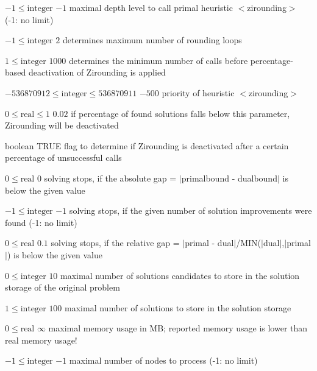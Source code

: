 %
{$-1\leq\textrm{integer}$}%
{$-1$}%
{maximal depth level to call primal heuristic $<$zirounding$>$ (-1: no limit)}%
{}

%
{$-1\leq\textrm{integer}$}%
{$2$}%
{determines maximum number of rounding loops}%
{}

%
{$1\leq\textrm{integer}$}%
{$1000$}%
{determines the minimum number of calls before percentage-based deactivation of Zirounding is applied}%
{}

%
{$-536870912\leq\textrm{integer}\leq536870911$}%
{$-500$}%
{priority of heuristic $<$zirounding$>$}%
{}

%
{$0\leq\textrm{real}\leq1$}%
{$0.02$}%
{if percentage of found solutions falls below this parameter, Zirounding will be deactivated}%
{}

%
{boolean}%
{TRUE}%
{flag to determine if Zirounding is deactivated after a certain percentage of unsuccessful calls}%
{}

%
{$0\leq\textrm{real}$}%
{$0$}%
{solving stops, if the absolute gap = $|$primalbound - dualbound$|$ is below the given value}%
{}

%
{$-1\leq\textrm{integer}$}%
{$-1$}%
{solving stops, if the given number of solution improvements were found (-1: no limit)}%
{}

%
{$0\leq\textrm{real}$}%
{$0.1$}%
{solving stops, if the relative gap = $|$primal - dual$|$/MIN($|$dual$|$,$|$primal$|$) is below the given value}%
{}

%
{$0\leq\textrm{integer}$}%
{$10$}%
{maximal number of solutions candidates to store in the solution storage of the original problem}%
{}

%
{$1\leq\textrm{integer}$}%
{$100$}%
{maximal number of solutions to store in the solution storage}%
{}

%
{$0\leq\textrm{real}$}%
{$\infty$}%
{maximal memory usage in MB; reported memory usage is lower than real memory usage!}%
{}

%
{$-1\leq\textrm{integer}$}%
{$-1$}%
{maximal number of nodes to process (-1: no limit)}%
{}

